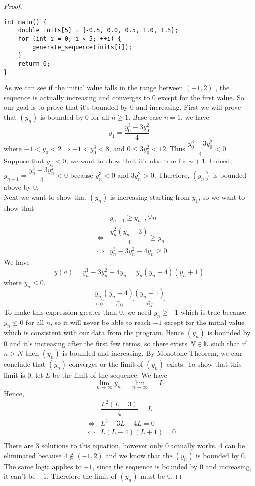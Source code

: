 \documentclass[10pt,letterpaper]{article}
\begin{document}
\begin{enumerate}[(a)]
\begin{proof}
\begin{verbatim}
int main() {
	double inits[5] = {-0.5, 0.0, 0.5, 1.0, 1.5};
	for (int i = 0; i < 5; ++i) {
		generate_sequence(inits[i]);
	}
	return 0;
}
\end{verbatim}
	As we can see if the initial value falls in the range between $(-1, 2)$ , the sequence is actually increasing 
	and converges to $0$ except for the first value. So our goal is to prove that it's bounded by $0$ and increasing.
	First we will prove that $(y_n)$ is bounded by $0$ for all $n \geq 1$. Base case $n = 1$, we have
	$$y_1 = \dfrac{y_0^3 - 3y_0^2}{4}$$
	where $-1 < y_0 < 2 \Rightarrow -1 < y_0^3 < 8$, and $0 \leq 3y_0^2 < 12$. Thus $\dfrac{y_0^3 - 3y_0^2}{4} < 0$.
	Suppose that $y_n < 0$, we want to show that it's also true for $n + 1$. Indeed,
	$y_{n+1} = \dfrac{y_n^3 - 3y_n^2}{4} < 0$ because $y_n^3 < 0$ and $3y_n^2 > 0$. Therefore,
	$(y_n)$ is bounded above by $0$. \\
	Next we want to show that $(y_n)$ is increasing starting from $y_1$, so we want to show
	that
	\begin{eqnarray*}
		& & y_{n+1} \geq y_n \, \, \, ,\forall n \\
		&\Leftrightarrow & \dfrac{y_n^2(y_n - 3)}{4} \geq y_{n} \\
		&\Leftrightarrow & y_n^3 - 3y_n^2 - 4y_n \geq 0 
	\end{eqnarray*}	 
	We have $$y(a) = y_n^3 - 3y_n^2 - 4y_n = y_n(y_n - 4)(y_n + 1)$$ where $y_n \leq 0$.  
	$$\underbrace{y_n}_{\leq 0}\underbrace{(y_n - 4)}_{\leq 0}\underbrace{(y_n + 1)}_{???}$$
 	To make this expression greater than 0, we need $y_n \geq -1$ which is true because 
 	$y_n \leq 0$ for all $n$, so it will never be able to reach $-1$ except for the initial
 	value which is consistent with our data from the program. Hence $(y_n)$ is bounded by $0$
 	and it's increasing after the first few terms, so there exists $N \in \mathbb{N}$ such that
 	if $n > N$ then $(y_n)$ is bounded and increasing. By Monotone Theorem, we can conclude
 	that $(y_n)$ converges or the limit of $(y_n)$ exists. 
	To show that this limit is $0$, let $L$ be the limit of the sequence. We have
	$$\displaystyle\lim_{n\to\infty}y_n = \displaystyle\lim_{n\to\infty} = L$$
	Hence,
	\begin{eqnarray*}
		&& \dfrac{L^2(L - 3)}{4} = L \\
		&\Leftrightarrow & L^3 - 3L - 4L = 0 \\
		&\Leftrightarrow & L(L - 4)(L + 1) = 0 \\
	\end{eqnarray*}
	There are 3 solutions to this equation, however only $0$ actually works. $4$ can be eliminated because 
	$4 \not\in (-1, 2)$ and we know that the $(y_n)$ is bounded by $0$. The same logic applies to $-1$,
	since the sequence is bounded by $0$ and increasing, it can't be $-1$. Therefore the limit of $(y_n)$
	must be $0$.
	\end{proof}
	

\end{enumerate}
\end{document}
